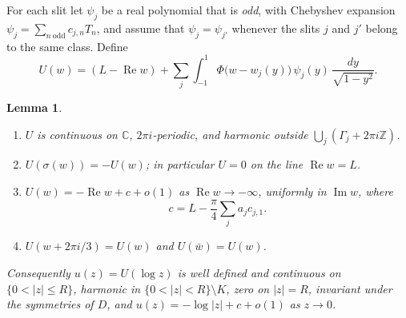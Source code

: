 \documentclass[11pt]{amsart}
\newtheorem{lemma}[proposition]{Lemma}
\theoremstyle{remark}
\newcommand{\C}{\mathbb C}
\newcommand{\Z}{\mathbb Z}
\newcommand{\re}{\operatorname{Re}}
\newcommand{\im}{\operatorname{Im}}
\newcommand{\dmu}{\frac{dy}{\sqrt{1-y^2}}}
\begin{document}
For each slit let $\psi_j$ be a real polynomial that is \emph{odd}, with Chebyshev expansion
$\psi_j=\sum_{n\ \mathrm{odd}}c_{j,n}T_n$, and assume that $\psi_j=\psi_{j'}$ whenever the slits $j$ and $j'$
belong to the same class. Define
\begin{equation}\label{eq:U}
U(w)=(L-\re w)+\sum_j\int_{-1}^{1}\Phi\bigl(w-w_j(y)\bigr)\,\psi_j(y)\,\dmu .
\end{equation}

\begin{lemma}\label{lem:U}
\begin{enumerate}[label=(\alph*),leftmargin=2.2em]
\item $U$ is continuous on $\C$, $2\pi i$-periodic, and harmonic outside $\bigcup_j(\Gamma_j+2\pi i\Z)$.
\item $U(\sigma(w))=-U(w)$; in particular $U=0$ on the line $\re w=L$.
\item $U(w)=-\re w+c+o(1)$ as $\re w\to-\infty$, uniformly in $\im w$, where
\begin{equation}\label{eq:c}
c=L-\frac\pi4\sum_ja_jc_{j,1}.
\end{equation}
\item $U(w+2\pi i/3)=U(w)$ and $U(\bar w)=U(w)$.
\end{enumerate}
Consequently $u(z)=U(\log z)$ is well defined and continuous on $\{0<|z|\le R\}$, harmonic in
$\{0<|z|<R\}\setminus K$, zero on $|z|=R$, invariant under the symmetries of $D$, and
$u(z)=-\log|z|+c+o(1)$ as $z\to0$.
\end{lemma}
\end{document}
